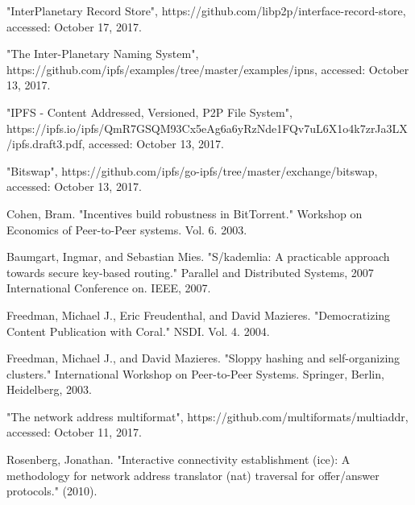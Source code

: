\documentclass[conference]{IEEEtran}
\begin{document}

%
%
%
\begin{thebibliography}{1}

 "InterPlanetary Record Store", https://github.com/libp2p/interface-record-store, accessed: October 17, 2017.

 "The Inter-Planetary Naming System", https://github.com/ipfs/examples/tree/master/examples/ipns, accessed: October 13, 2017.

 "IPFS - Content Addressed, Versioned, P2P File System", https://ipfs.io/ipfs/QmR7GSQM93Cx5eAg6a6yRzNde1FQv7uL6X1o4k7zrJa3LX/ipfs.draft3.pdf, accessed: October 13, 2017.

 "Bitswap", https://github.com/ipfs/go-ipfs/tree/master/exchange/bitswap, accessed: October 13, 2017.

 Cohen, Bram. "Incentives build robustness in BitTorrent." Workshop on Economics of Peer-to-Peer systems. Vol. 6. 2003.

 Baumgart, Ingmar, and Sebastian Mies. "S/kademlia: A practicable approach towards secure key-based routing." Parallel and Distributed Systems, 2007 International Conference on. IEEE, 2007.

 Freedman, Michael J., Eric Freudenthal, and David Mazieres. "Democratizing Content Publication with Coral." NSDI. Vol. 4. 2004.

 Freedman, Michael J., and David Mazieres. "Sloppy hashing and self-organizing clusters." International Workshop on Peer-to-Peer Systems. Springer, Berlin, Heidelberg, 2003.

 "The network address multiformat", https://github.com/multiformats/multiaddr, accessed: October 11, 2017.

 Rosenberg, Jonathan. "Interactive connectivity establishment (ice): A methodology for network address translator (nat) traversal for offer/answer protocols." (2010).


\end{thebibliography}
\end{document}
